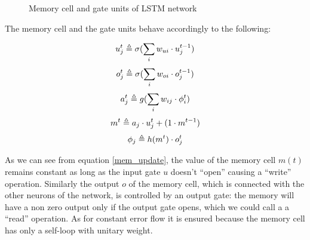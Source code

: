 \begin{figure}[h]
\caption{Memory cell and gate units of LSTM network}
\label{lstm_neuron}
\end{figure}

The memory cell and the gate units behave accordingly to the following:

\begin{equation}
u^t_j\triangleq \sigma(\sum_i w_{ui}\cdot u^{t-1}_j)
\end{equation}
\begin{equation}
o^t_j\triangleq \sigma(\sum_i w_{oi}\cdot o^{t-1}_j)
\end{equation}
\begin{equation}
a^t_j\triangleq g(\sum_i w_{ij}\cdot \phi_i^t)
\end{equation}
\begin{equation}
 m^t\triangleq a_j\cdot u_j^t + (1 \cdot m^{t-1})
\label{mem_update}
\end{equation}
\begin{equation}
 \phi_j\triangleq h(m^t)\cdot o^t_j
\end{equation}

As we can see from equation \ref{mem_update}, the value of the memory cell $m(t)$ remains constant as long as the input 
gate $u$ doesn't ``open'' causing a ``write'' operation. Similarly the output $o$ of the memory cell, which is 
connected with 
the other neurons of the network, is controlled by an output gate: the memory will have a non zero output only if the 
output gate opens, which we could call a  a ``read'' operation. As for constant error flow it is ensured because the 
memory cell has only a self-loop with unitary weight.


